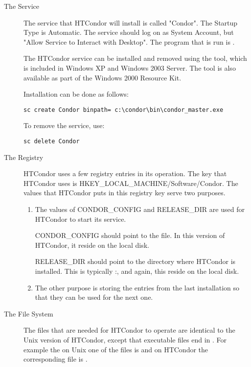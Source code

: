 \begin{description}
\item [The Service]
The service that HTCondor will install is called "Condor".  The Startup
Type is Automatic.  The service should log on as System Account, but
 "Allow Service to Interact with Desktop".  The
program that is run is .

The HTCondor service can be installed and removed using the
 tool, which is included in Windows XP and Windows 2003
Server. The tool is also available as part of the Windows 2000
Resource Kit.

Installation can be done as follows:
\begin{verbatim}
sc create Condor binpath= c:\condor\bin\condor_master.exe
\end{verbatim}

To remove the service, use:
\begin{verbatim}
sc delete Condor
\end{verbatim}

\item [The Registry]
HTCondor uses a few registry entries in its operation.  The key that HTCondor
uses is HKEY\_LOCAL\_MACHINE/Software/Condor.  The values that HTCondor puts
in this registry key serve two purposes.
\begin{enumerate}
\item The values of CONDOR\_CONFIG and RELEASE\_DIR are used for HTCondor
to start its service.

CONDOR\_CONFIG should point to the  file.  In this version
of HTCondor, it  reside on the local disk.

RELEASE\_DIR should point to the directory where HTCondor is installed.  This
is typically
\verb@C:\Condor@, and again, this  reside on the
local disk.

\item The other purpose is storing the entries from the last installation
so that they can be used for the next one.
\end{enumerate}

\item [The File System]
The files that are needed for HTCondor to operate are identical to the Unix
version of HTCondor, except that executable files end in .  For
example the on Unix one of the files is  and on HTCondor
the corresponding file is .


\end{description}
